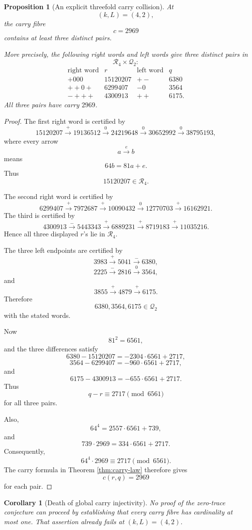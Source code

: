 \documentclass[11pt]{article}
\newtheorem{proposition}[theorem]{Proposition}
\newtheorem{corollary}[theorem]{Corollary}
\theoremstyle{remark}
\newcommand{\Rset}{\mathcal{R}}
\newcommand{\Qset}{\mathcal{Q}}
\begin{document}
\begin{proposition}[An explicit threefold carry collision]
\label{prop:triple-collision}
At
\[
(k,L)=(4,2),
\]
the carry fibre
\[
c=2969
\]
contains at least three distinct pairs.

More precisely, the following right words and left words give three distinct pairs in
\[
\Rset_4\times\Qset_2:
\]
\[
\begin{array}{c|c|c|c}
\text{right word}&r&\text{left word}&q\\ \hline
+000&15120207&+-&6380\\
++0+&6299407&-0&3564\\
-+++&4300913&++&6175.
\end{array}
\]
All three pairs have carry \(2969\).
\end{proposition}

\begin{proof}
The first right word is certified by
\[
15120207
\xrightarrow{+}
19136512
\xrightarrow{0}
24219648
\xrightarrow{0}
30652992
\xrightarrow{0}
38795193,
\]
where every arrow
\[
a\xrightarrow{e}b
\]
means
\[
64b=81a+e.
\]
Thus
\[
15120207\in\Rset_4.
\]

The second right word is certified by
\[
6299407
\xrightarrow{+}
7972687
\xrightarrow{+}
10090432
\xrightarrow{0}
12770703
\xrightarrow{+}
16162921.
\]
The third is certified by
\[
4300913
\xrightarrow{-}
5443343
\xrightarrow{+}
6889231
\xrightarrow{+}
8719183
\xrightarrow{+}
11035216.
\]
Hence all three displayed \(r\)'s lie in \(\Rset_4\).

The three left endpoints are certified by
\[
3983
\xrightarrow{+}
5041
\xrightarrow{-}
6380,
\]
\[
2225
\xrightarrow{-}
2816
\xrightarrow{0}
3564,
\]
and
\[
3855
\xrightarrow{+}
4879
\xrightarrow{+}
6175.
\]
Therefore
\[
6380,3564,6175\in\Qset_2
\]
with the stated words.

Now
\[
81^2=6561,
\]
and the three differences satisfy
\[
6380-15120207
=
-2304\cdot6561+2717,
\]
\[
3564-6299407
=
-960\cdot6561+2717,
\]
and
\[
6175-4300913
=
-655\cdot6561+2717.
\]
Thus
\[
q-r\equiv2717\pmod{6561}
\]
for all three pairs.

Also,
\[
64^4
=
2557\cdot6561+739,
\]
and
\[
739\cdot2969
=
334\cdot6561+2717.
\]
Consequently,
\[
64^4\cdot2969\equiv2717\pmod{6561}.
\]
The carry formula in Theorem \ref{thm:carry-law} therefore gives
\[
c(r,q)=2969
\]
for each pair.
\end{proof}

\begin{corollary}[Death of global carry injectivity]
\label{cor:global-injectivity-dead}
No proof of the zero-trace conjecture can proceed by establishing that every carry fibre has cardinality at most one.  That assertion already fails at \((k,L)=(4,2)\).
\end{corollary}
\end{document}
